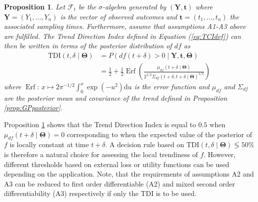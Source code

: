 \documentclass[
  11pt,
]{article}
\newtheorem{proposition}{Proposition}
\theoremstyle{nonumberplain}
\begin{document}
\vspace{0.2cm}

\begin{proposition}
Let $\mathcal{F}_t$ be the $\sigma$-algebra generated by $(\mathbf{Y}, \mathbf{t})$ where $\mathbf{Y} = (Y_1, \ldots, Y_n)$ is the vector of observed outcomes and $\mathbf{t} = (t_1, \ldots, t_n)$ the associated sampling times. Furthermore, assume that assumptions A1-A3 above are fulfilled. The Trend Direction Index defined in Equation (\ref{eq:TCIdef}) can then be written in terms of the posterior distribution of $df$ as
\begin{align*}
  \mathrm{TDI}(t, \delta \mid \bm{\Theta}) &= P(df(t + \delta ) > 0 \mid \mathbf{Y}, \mathbf{t}, \bm{\Theta})\\
  &= \frac{1}{2} + \frac{1}{2}\mathop{\mathrm{Erf}}\left(\frac{\mu_{df}(t + \delta \mid \bm{\Theta})}{2^{1/2}\Sigma_{df}(t + \delta, t + \delta \mid \bm{\Theta})^{1/2}}\right)
\end{align*}
where $\mathop{\mathrm{Erf}}\colon\, x \mapsto 2\pi^{-1/2}\int_0^x \exp(-u^2)\mathrm{d}u$ is the error function and $\mu_{df}$ and $\Sigma_{df}$ are the posterior mean and covariance of the trend defined in Proposition \ref{prop:GPposterior}.
\label{prop:TDIposterior}
\end{proposition}

Proposition \ref{prop:TDIposterior} shows that the Trend Direction Index
is equal to \(0.5\) when \(\mu_{df}(t + \delta \mid \bm{\Theta}) = 0\)
corresponding to when the expected value of the posterior of \(f\) is
locally constant at time \(t + \delta\). A decision rule based on
\(\mathrm{TDI}(t, \delta \mid \bm{\Theta}) \lessgtr 50\%\) is therefore
a natural choice for assessing the local trendiness of \(f\). However,
different thresholds based on external loss or utility functions can be
used depending on the application. Note, that the requirements of
assumptions A2 and A3 can be reduced to first order differentiable (A2)
and mixed second order differentiability (A3) respectively if only the
TDI is to be used.
\end{document}
